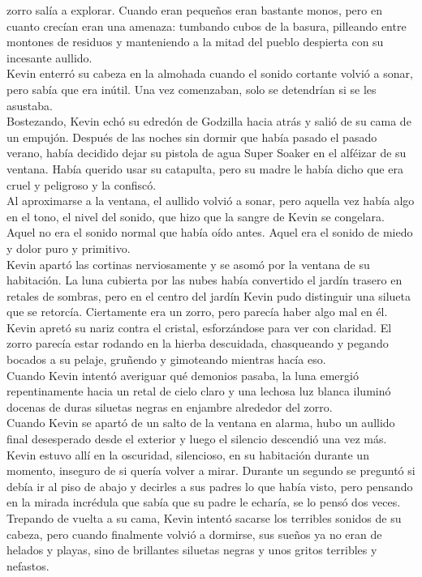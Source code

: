 {zorro salía a explorar. Cuando eran pequeños eran bastante monos, pero
en cuanto crecían eran una amenaza: tumbando cubos de la basura,
pilleando entre montones de residuos y manteniendo a la mitad del pueblo
despierta con su incesante aullido.\\
Kevin enterró su cabeza en la almohada cuando el sonido cortante volvió
a sonar, pero sabía que era inútil. Una vez comenzaban, solo se
detendrían si se les asustaba.\\
Bostezando, Kevin echó su edredón de Godzilla hacia atrás y salió de su
cama de un empujón. Después de las noches sin dormir que había pasado el
pasado verano, había decidido dejar su pistola de agua Super Soaker en
el alféizar de su ventana. Había querido usar su catapulta, pero su
madre le había dicho que era cruel y peligroso y la confiscó.\\
Al aproximarse a la ventana, el aullido volvió a sonar, pero aquella vez
había algo en el tono, el nivel del sonido, que hizo que la sangre de
Kevin se congelara. Aquel no era el sonido normal que había oído antes.
Aquel era el sonido de miedo y dolor puro y primitivo.\\
Kevin apartó las cortinas nerviosamente y se asomó por la ventana de su
habitación. La luna cubierta por las nubes había convertido el jardín
trasero en retales de sombras, pero en el centro del jardín Kevin pudo
distinguir una silueta que se retorcía. Ciertamente era un zorro, pero
parecía haber algo mal en él. Kevin apretó su nariz contra el cristal,
esforzándose para ver con claridad. El zorro parecía estar rodando en la
hierba descuidada, chasqueando y pegando bocados a su pelaje, gruñendo y
gimoteando mientras hacía eso.\\
Cuando Kevin intentó averiguar qué demonios pasaba, la luna emergió
repentinamente hacia un retal de cielo claro y una lechosa luz blanca
iluminó docenas de duras siluetas negras en enjambre alrededor del
zorro.\\
Cuando Kevin se apartó de un salto de la ventana en alarma, hubo un
aullido final desesperado desde el exterior y luego el silencio
descendió una vez más.\\
Kevin estuvo allí en la oscuridad, silencioso, en su habitación durante
un momento, inseguro de si quería volver a mirar. Durante un segundo se
preguntó si debía ir al piso de abajo y decirles a sus padres lo que
había visto, pero pensando en la mirada incrédula que sabía que su padre
le echaría, se lo pensó dos veces.\\
Trepando de vuelta a su cama, Kevin intentó sacarse los terribles
sonidos de su cabeza, pero cuando finalmente volvió a dormirse, sus
sueños ya no eran de helados y playas, sino de brillantes siluetas
negras y unos gritos terribles y nefastos.\\
}
